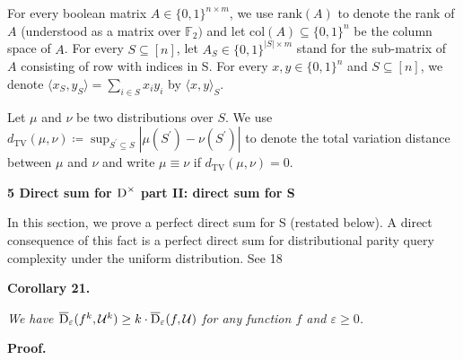 \documentclass[10pt,a4paper]{article}
\begin{document}
For every boolean matrix $A\in\{0,1\}^{n\times m}$, we use $\mathrm{rank}(A)$ to denote the rank of $A$ (understood as a matrix over $\mathbb{F}_{2})$ and let $\mathrm{col}(A)\subseteq\{0,1\}^{n}$ be the column space of $A$. For every $S\subseteq[n]$, let $A_{S}\in\{0,1\}^{|S|\times m}$ stand for the sub-matrix of $A$ consisting of row with indices in S. For every $x,y\in\{0,1\}^{n}$ and $S\subseteq[n]$, we denote $\langle x_{S},y_{S}\rangle=\sum_{i\in S}x_{i}y_{i}$ by $\langle x,y\rangle_{S}$.\par




Let $\mu$ and $\nu$ be two distributions over $S$. We use $d_{\mathrm{TV}}(\mu,\nu)\coloneqq\sup_{S^{\prime}\subseteq S}|\mu(S^{\prime})-\nu(S^{\prime})|$ to denote the total variation distance between $\mu$ and $\nu$ and write $\mu\equiv\nu$ if $d_{\mathrm{TV}}(\mu,\nu)=0$.\par






\par\medskip\noindent\textbf{
5 Direct sum for ${\textup{D}}^{\times}$ part II: direct sum for S
}\par




In this section, we prove a perfect direct sum for S (restated below). A direct consequence of this fact is a perfect direct sum for distributional parity query complexity under the uniform distribution.
See 18\par





\par\medskip\noindent\textbf{
\textbf{Corollary 21}\textbf{.}
}\par



\emph{We have $\overline{{\textup{D}}}_{\varepsilon}(f^{k},\mathcal{U}^{k})\geq k\cdot\overline{{\textup{D}}}_{\varepsilon}(f,\mathcal{U})$ for any function $f$ and $\varepsilon\geq 0$.}\par






\par\medskip\noindent\textbf{Proof.}\par
\end{document}
